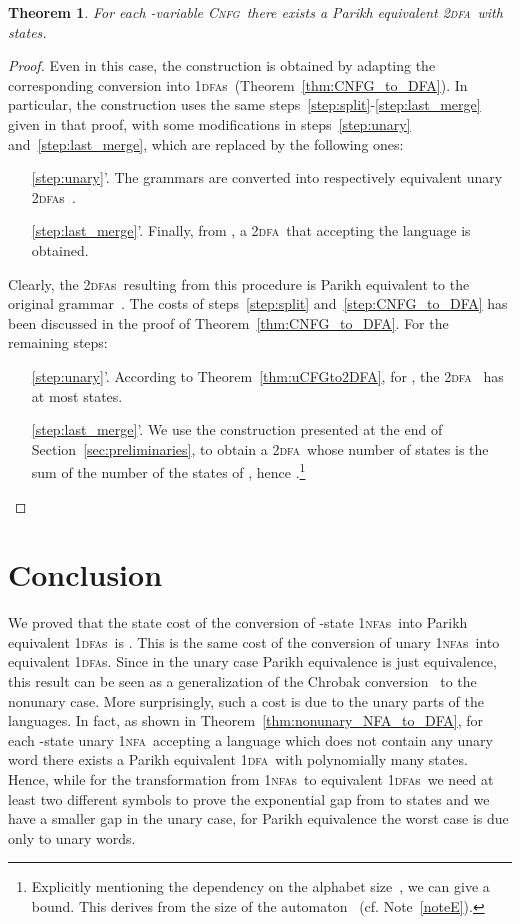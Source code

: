 \documentclass[11pt]{article}
\newcommand*{\tw}{\textsc{2}}
\newcommand*{\twdfa}{\tw\textsc{dfa}}
\newcommand*{\twdfas}{\tw\textsc{dfa}s}
\newcommand*{\ow}{\textsc{1}}
\newcommand*{\owdfa}{\ow\textsc{dfa}}
\newcommand*{\owdfas}{\ow\textsc{dfa}s}
\newcommand*{\ownfa}{\ow\textsc{nfa}}
\newcommand*{\ownfas}{\ow\textsc{nfa}s}
\newcommand*{\cnfg}{\textsc{Cnfg}}
\newtheorem{theorem}{Theorem}[section]
\begin{document}
{\begin{theorem}\label{thm:CFGto2DFA}
  For each -variable \cnfg\ there exists a Parikh equivalent \twdfa\ with  states.
\end{theorem}
\begin{proof}
  Even in this case, the construction is obtained by adapting the corresponding conversion
  into \owdfas\ (Theorem~\ref{thm:CNFG_to_DFA}).
  In particular, the construction uses the same steps~\ref{step:split}-\ref{step:last_merge} given
  in that proof, with some modifications in steps~\ref{step:unary} and~\ref{step:last_merge}, which are replaced
  by the following ones:
\begin{itemize}
  \item[\ref{step:unary}'.]
	The grammars  are converted into respectively equivalent unary \twdfas\ .
\item[\ref{step:last_merge}'.]
	Finally, {}from , a \twdfa\ that accepting the language
	 is obtained.
\end{itemize}
  Clearly, the \twdfas\ resulting from this procedure is Parikh equivalent to the original grammar~.
  The costs of steps~\ref{step:split} and~\ref{step:CNFG_to_DFA} has been discussed in the proof
  of Theorem~\ref{thm:CNFG_to_DFA}. For the remaining steps:
\begin{itemize}
  \item[\ref{step:unary}'.]
	According to Theorem~\ref{thm:uCFGto2DFA}, for , the \twdfa~ has at most
	 states.
\item[\ref{step:last_merge}'.]
	We use the construction presented at the end of Section~\ref{sec:preliminaries}, to obtain a
	\twdfa\ whose number of states is the sum of the number of the states of ,
	hence .\footnote{Explicitly mentioning the dependency on the alphabet size~, we can give 
	a~ bound. This derives from the size of the automaton~ (cf. Note~\ref{noteE}).
}
\qedhere
\end{itemize}
\end{proof}


\section{Conclusion}
	\label{sec:conclu}


We proved that the state cost of the conversion of -state \ownfas\ into Parikh equivalent \owdfas\ is 
. This is the same cost of the conversion of unary \ownfas\
into equivalent \owdfas.
Since in the unary case Parikh equivalence is just equivalence, this result can be seen as
a generalization of the Chrobak conversion~\cite{Chrobak1986} to the nonunary case.
More surprisingly, such a cost is due to the unary parts of the languages. In fact, as shown
in Theorem~\ref{thm:nonunary_NFA_to_DFA}, for each -state unary \ownfa\ accepting a language
which does not contain any unary word there exists a Parikh equivalent \owdfa\ with polynomially many states.
Hence, while for the transformation {}from \ownfas\ to equivalent \owdfas\ we need at least two different
symbols to prove the exponential gap {}from  to  states and we have a smaller gap
in the unary case, for Parikh equivalence the worst case is due only to unary words.

}
\end{document}
